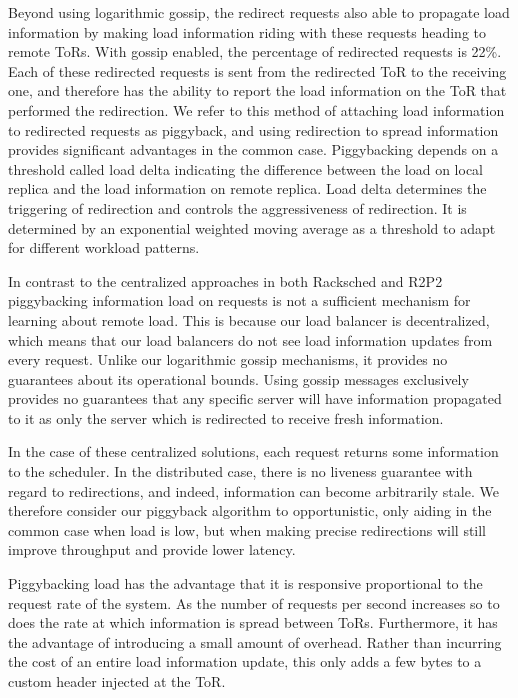 Beyond using logarithmic gossip, the redirect requests also able to propagate load information by making load information riding with these requests heading to remote ToRs.  
%
%
With gossip enabled, the percentage of redirected requests is 22\%. 
%
Each of these redirected requests is sent from the redirected ToR to the receiving one, and therefore has the ability to report the load information on the ToR that performed the redirection.  
%
We refer to this method of attaching load information to
redirected requests as piggyback, and using redirection to spread information
provides significant advantages in the common case.
%
Piggybacking depends on a threshold called load delta indicating the difference 
between the load on local replica and the load information on remote replica.
%
Load delta determines the triggering of redirection and controls the aggressiveness of redirection.
%
It is determined by an exponential weighted moving average as a threshold to adapt for different workload patterns.

In contrast to the centralized approaches in both Racksched and
R2P2~\cite{racksched, r2p2} piggybacking information load on requests
is not a sufficient mechanism for learning about remote load. This is
because our load balancer is decentralized, which means that our load
balancers do not see load information updates from every request.
Unlike our logarithmic gossip mechanisms, it provides no guarantees
about its operational bounds. Using gossip messages exclusively
provides no guarantees that any specific server will have information
propagated to it as only the server which is redirected to receive
fresh information.

In the case of these centralized solutions, each request returns some
information to the scheduler. In the distributed case, there is no liveness
guarantee with regard to redirections, and indeed, information can become
arbitrarily stale. We therefore consider our piggyback algorithm to
opportunistic, only aiding in the common case when load is low, but when making
precise redirections will still improve throughput and provide
lower latency.

Piggybacking load has the advantage that it is responsive proportional to the
request rate of the system. 
%
As the number of requests per second increases so to does the rate at which information is spread between ToRs. 
%
Furthermore, it has the advantage of introducing a small amount of overhead. Rather than incurring the cost of an entire load information update, this only adds a few bytes to a custom header injected at the ToR.


